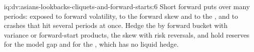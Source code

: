 \begin{solution}{iq:dv:asians-lookbacks-cliquets-and-forward-starts:6}
Short forward puts over many periods: exposed to forward volatility, to the forward skew and to the , and to crashes that hit several periods at once. Hedge the  by forward bucket with variance or forward-start
products, the skew with risk reversals, and hold reserves for the model gap and for the , which has
no liquid hedge.
\end{solution}

